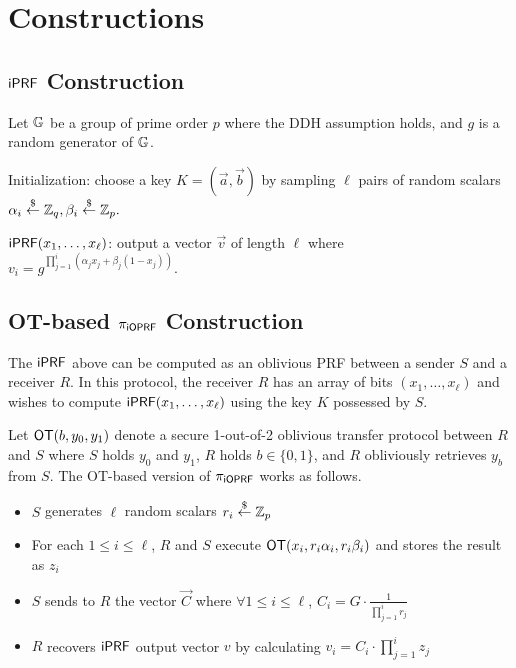 \section{Constructions}
\subsection{$\mathsf{i}\mathsf{PRF}$ Construction}
Let $\mathbb{G}$ be a group of prime order $p$ where the DDH assumption holds,
and $g$ is a random generator of $\mathbb{G}$.

Initialization: choose a key $K=(\vec{{a}},\vec{b})$ by sampling
$\ell$ pairs of random scalars
${\alpha_{i}}\stackrel{\$}{\leftarrow}\mathbb{Z}_q,{\beta_{i}}\stackrel{\$}{\leftarrow}\mathbb{Z}_p.$

$\mathsf{i}\mathsf{PRF}(x_1,\ldots,x_\ell)$: output a vector $\vec{v}$ of length $\ell$ where $v_i = g^{\prod_{j=1}^{i} (\alpha_jx_j+\beta_j(1-x_j))}.$





\subsection{OT-based ${\pi_{\mathsf{i}\mathsf{OPRF}}}$ Construction}

The $\mathsf{i}\mathsf{PRF}$ above can be computed as an oblivious PRF between a sender $S$ and a receiver $R$.  In this protocol,
the receiver $R$ has an array of bits $(x_1, \ldots, x_\ell)$ and wishes to compute $\mathsf{i}\mathsf{PRF}(x_1, \ldots, x_\ell)$ using
the key $K$ possessed by $S$.

Let $\mathsf{OT}(b, y_0, y_1)$ denote a secure 1-out-of-2 oblivious transfer protocol between $R$ and $S$ where
$S$ holds $y_0$ and $y_1$, $R$ holds $b\in\{0,1\}$, and $R$ obliviously retrieves $y_b$ from $S$.  The OT-based version of ${\pi_{\mathsf{i}\mathsf{OPRF}}}$ works as follows.

\begin{itemize}
\item $S$ generates $\ell$ random scalars $r_i\stackrel{\$}{\leftarrow}\mathbb{Z}_p$
\item For each $1 \leq i \leq \ell$, $R$ and $S$ execute $\mathsf{OT}(x_i, r_i\alpha_i, r_i\beta_i)$ and stores the result as $z_i$
\item $S$ sends to $R$ the vector $\vec{C}$ where $\forall 1 \leq i \leq \ell$, $C_i =  G \cdot \frac{1}{\prod_{j=1}^{i} r_j}$
\item $R$ recovers $\mathsf{i}\mathsf{PRF}$ output vector $v$ by calculating $v_i = C_i \cdot \prod_{j=1}^{i} z_j$
\end{itemize}


